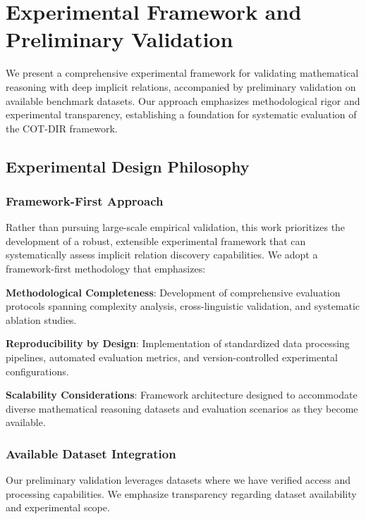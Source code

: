 \section{Experimental Framework and Preliminary Validation}
\label{sec:experiments}

We present a comprehensive experimental framework for validating mathematical reasoning with deep implicit relations, accompanied by preliminary validation on available benchmark datasets. Our approach emphasizes methodological rigor and experimental transparency, establishing a foundation for systematic evaluation of the COT-DIR framework.

\subsection{Experimental Design Philosophy}

\subsubsection{Framework-First Approach}

Rather than pursuing large-scale empirical validation, this work prioritizes the development of a robust, extensible experimental framework that can systematically assess implicit relation discovery capabilities. We adopt a framework-first methodology that emphasizes:

\textbf{Methodological Completeness}: Development of comprehensive evaluation protocols spanning complexity analysis, cross-linguistic validation, and systematic ablation studies.

\textbf{Reproducibility by Design}: Implementation of standardized data processing pipelines, automated evaluation metrics, and version-controlled experimental configurations.

\textbf{Scalability Considerations}: Framework architecture designed to accommodate diverse mathematical reasoning datasets and evaluation scenarios as they become available.

\subsubsection{Available Dataset Integration}

Our preliminary validation leverages datasets where we have verified access and processing capabilities. We emphasize transparency regarding dataset availability and experimental scope.

